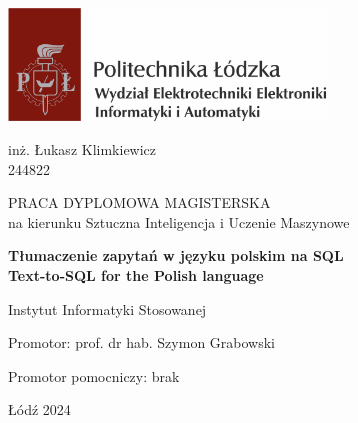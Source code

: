 \begin{titlepage}
    \includegraphics[height=3cm]{images/pl_weeia.png}
    \hfill
    
    \centering
    \vspace{24pt}
    
    {
        \large 
        inż. Łukasz Klimkiewicz
        \\
        244822
        \par
    }

    \vfill
    {
        \large PRACA DYPLOMOWA MAGISTERSKA 
        \\
        \large na kierunku Sztuczna Inteligencja i Uczenie Maszynowe
    }
    
    \par
    \vfill
    {
        \large\bfseries
        Tłumaczenie zapytań w języku polskim na SQL
        \\
        Text-to-SQL for the Polish language
        \par
    }

    \vfill


    \raggedright
    {
        \large
        Instytut Informatyki Stosowanej
        \par
    }
    {
        \large 
        Promotor: prof. dr hab. Szymon Grabowski
        \par
    }
    {
        \large 
        Promotor pomocniczy: brak
        \par
    }
    \vspace{24pt}

    \centering
    {\large Łódź 2024 \par}

\end{titlepage}
